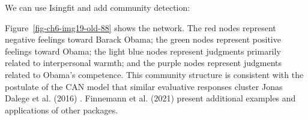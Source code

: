\documentclass[
  a4paper,
  DIV=11,
  numbers=noendperiod,
  oneside]{scrreprt}
\newenvironment{Shaded}{\begin{snugshade}}{\end{snugshade}}
\newcommand{\AttributeTok}[1]{\textcolor[rgb]{0.40,0.45,0.13}{#1}}
\newcommand{\CommentTok}[1]{\textcolor[rgb]{0.37,0.37,0.37}{#1}}
\newcommand{\ConstantTok}[1]{\textcolor[rgb]{0.56,0.35,0.01}{#1}}
\newcommand{\DecValTok}[1]{\textcolor[rgb]{0.68,0.00,0.00}{#1}}
\newcommand{\FunctionTok}[1]{\textcolor[rgb]{0.28,0.35,0.67}{#1}}
\newcommand{\NormalTok}[1]{\textcolor[rgb]{0.00,0.23,0.31}{#1}}
\newcommand{\OtherTok}[1]{\textcolor[rgb]{0.00,0.23,0.31}{#1}}
\newcommand{\SpecialCharTok}[1]{\textcolor[rgb]{0.37,0.37,0.37}{#1}}
\newcommand{\StringTok}[1]{\textcolor[rgb]{0.13,0.47,0.30}{#1}}
\begin{document}
We can use Isingfit and add community detection:

\begin{Shaded}
\end{Shaded}

Figure~\ref{fig-ch6-img19-old-88} shows the network. The red nodes
represent negative feelings toward Barack Obama; the green nodes
represent positive feelings toward Obama; the light blue nodes represent
judgments primarily related to interpersonal warmth; and the purple
nodes represent judgments related to Obama's competence. This community
structure is consistent with the postulate of the CAN model that similar
evaluative responses cluster Jonas Dalege et al. (2016) . Finnemann et
al. (2021) present additional examples and applications of other
packages.
\end{document}
